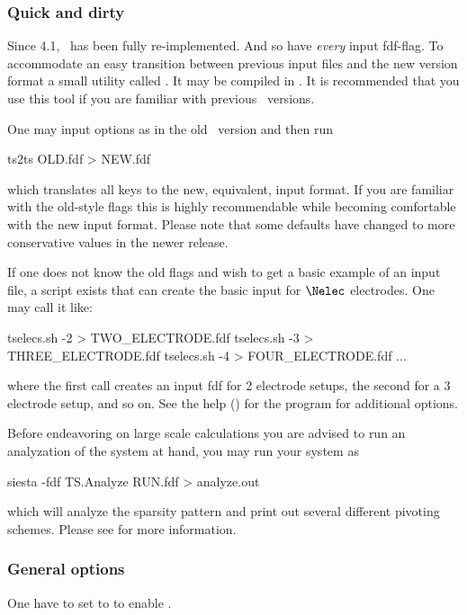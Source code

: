\subsubsection{Quick and dirty}

Since 4.1, \tsiesta\ has been fully re-implemented. And so have
\emph{every} input fdf-flag. To accommodate an easy transition between
previous input files and the new version format a small utility called
. It may be compiled in . It is
recommended that you use this tool if you are familiar with previous
\tsiesta\ versions.

%
One may input options as in the old \tsiesta\ version and then run
\begin{fdfexample}
  ts2ts OLD.fdf > NEW.fdf
\end{fdfexample}
which translates all keys to the new, equivalent, input format. If you
are familiar with the old-style flags this is highly recommendable
while becoming comfortable with the new input format. Please note that
some defaults have changed to more conservative values in the newer
release.

If one does not know the old flags and wish to get a basic example of
an input file, a script  exists that can
create the basic input for $\Nelec$ electrodes. One may call it like:
\begin{shellexample}
  tselecs.sh -2 > TWO_ELECTRODE.fdf
  tselecs.sh -3 > THREE_ELECTRODE.fdf
  tselecs.sh -4 > FOUR_ELECTRODE.fdf
  ...
\end{shellexample}
where the first call creates an input fdf for 2 electrode setups, the
second for a 3 electrode setup, and so on. See the help ()
for the program for additional options.

Before endeavoring on large scale calculations you are advised to run
an analyzation of the system at hand, you may run your system as
\begin{shellexample}
  siesta -fdf TS.Analyze RUN.fdf > analyze.out
\end{shellexample}
which will analyze the sparsity pattern and print out several
different pivoting schemes. Please see  for more
information.


\subsubsection{General options}

One have to set  to  to enable
\tsiesta.

